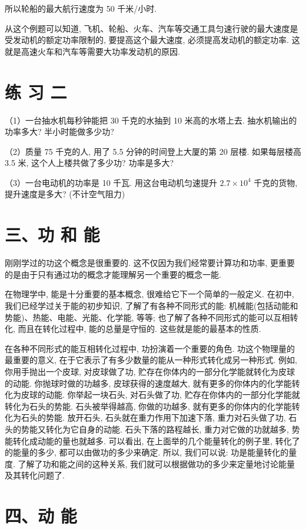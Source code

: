 \documentclass[10pt]{article}
\begin{document}
所以轮船的最大航行速度为 50 千米/小时.

从这个例题可以知道, 飞机、轮船、火车、汽车等交通工具匀速行驶的最大速度是受发动机的额定功率限制的, 要提高这个最大速度, 必须提高发动机的额定功率. 这就是高速火车和汽车等需要大功率发动机的原因.

\section*{练 习 二}

（1）一台抽水机每秒钟能把 30 千克的水抽到 10 米高的水塔上去. 抽水机输出的功率多大? 半小时能做多少功?

（2）质量 75 千克的人, 用了 5.5 分钟的时间登上大厦的第 20 层楼. 如果每层楼高 3.5 米, 这个人上楼共做了多少功? 功率是多大?

（3）一台电动机的功率是 10 千瓦. 用这台电动机匀速提升 \({2.7} \times {10}^{4}\) 千克的货物,提升速度是多大? (不计空气阻力)

\section*{三、功 和 能}

刚刚学过的功这个概念是很重要的. 这不仅因为我们经常要计算功和功率, 更重要的是由于只有通过功的概念才能理解另一个重要的概念一能.

在物理学中, 能是十分重要的基本概念, 很难给它下一个简单的一般定义. 在初中, 我们已经学过关于能的初步知识, 了解了有各种不同形式的能: 机械能(包括动能和势能)、热能、电能、光能、化学能, 等等; 也了解了各种不同形式的能可以互相转化, 而且在转化过程中, 能的总量是守恒的. 这些就是能的最基本的性质.

在各种不同形式的能互相转化过程中, 功扮演着一个重要的角色. 功这个物理量的最重要的意义, 在于它表示了有多少数量的能从一种形式转化成另一种形式. 例如, 你用手抛出一个皮球, 对皮球做了功, 贮存在你体内的一部分化学能就转化为皮球的动能. 你抛球时做的功越多, 皮球获得的速度越大, 就有更多的你体内的化学能转化为皮球的动能. 你举起一块石头, 对石头做了功, 贮存在你体内的一部分化学能就转化为石头的势能. 石头被举得越高, 你做的功越多, 就有更多的你体内的化学能转化为石头的势能. 放开石头, 石头就在重力作用下加速下落, 重力对石头做了功, 石头的势能又转化为它自身的动能. 石头下落的路程越长, 重力对它做的功就越多, 势能转化成动能的量也就越多. 可以看出, 在上面举的几个能量转化的例子里, 转化了的能量的多少, 都可以由做功的多少来确定. 所以, 我们可以说: 功是能量转化的量度. 了解了功和能之间的这种关系, 我们就可以根据做功的多少来定量地讨论能量及其转化问题了.

\section*{四、动 能}
\end{document}
